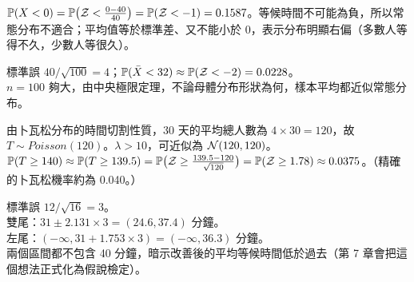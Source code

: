 \begin{answers}
    \item $\mathbb{P}(X < 0) = \mathbb{P}\big(\mathcal{Z} < \frac{0-40}{40}\big) = \mathbb{P}(\mathcal{Z} < -1) = 0.1587$。等候時間不可能為負，所以常態分布不適合；平均值等於標準差、又不能小於 0，表示分布明顯右偏（多數人等得不久，少數人等很久）。
    \item 標準誤 $40/\sqrt{100} = 4$；$\mathbb{P}(\bar{X} < 32) \approx \mathbb{P}(\mathcal{Z} < -2) = 0.0228$。\\
          $n = 100$ 夠大，由中央極限定理，不論母體分布形狀為何，樣本平均都近似常態分布。
    \item 由卜瓦松分布的時間切割性質，30 天的平均總人數為 $4 \times 30 = 120$，故 $T \sim Poisson(120)$。$\lambda > 10$，可近似為 $\mathcal{N}(120, 120)$。\\
          $\mathbb{P}(T \ge 140) \approx \mathbb{P}(T \ge 139.5) = \mathbb{P}\big(\mathcal{Z} \ge \frac{139.5-120}{\sqrt{120}}\big) = \mathbb{P}(\mathcal{Z} \ge 1.78) \approx 0.0375$。（精確的卜瓦松機率約為 0.040。）
    \item 標準誤 $12/\sqrt{16} = 3$。\\
          雙尾：$31 \pm 2.131 \times 3 = (24.6, 37.4)$ 分鐘。\\
          左尾：$(-\infty, 31 + 1.753 \times 3) = (-\infty, 36.3)$ 分鐘。\\
          兩個區間都不包含 40 分鐘，暗示改善後的平均等候時間低於過去（第 7 章會把這個想法正式化為假說檢定）。
\end{answers}


